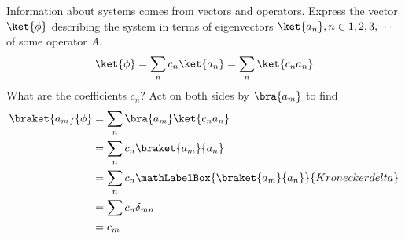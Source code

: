 %
%
%

Information about systems comes from vectors and operators.  Express the vector \(\ket{\phi}\) describing the system in terms of eigenvectors \(\ket{a_n}, n \in 1,2,3,\cdots\) of some operator \(A\).
%
\begin{equation}\label{eqn:PHY356FLecture10:51}
\ket{\phi} = \sum_n c_n \ket{a_n} = \sum_n \ket{c_n a_n}
\end{equation}
%
What are the coefficients \(c_n\)?  Act on both sides by \(\bra{a_m}\) to find
%
\begin{equation}\label{eqn:lecture5BigReviewCh1Formalism:71}
\begin{aligned}
\braket{a_m}{\phi}
&= \sum_n \bra{a_m} \ket{ c_n a_n } \\
&= \sum_n c_n \braket{a_m}{ a_n } \\
&= \sum_n c_n
\mathLabelBox{\braket{a_m}{a_n}}{Kronecker delta}
\\
&= \sum c_n \delta_{mn} \\
&= c_m
\end{aligned}
\end{equation}

